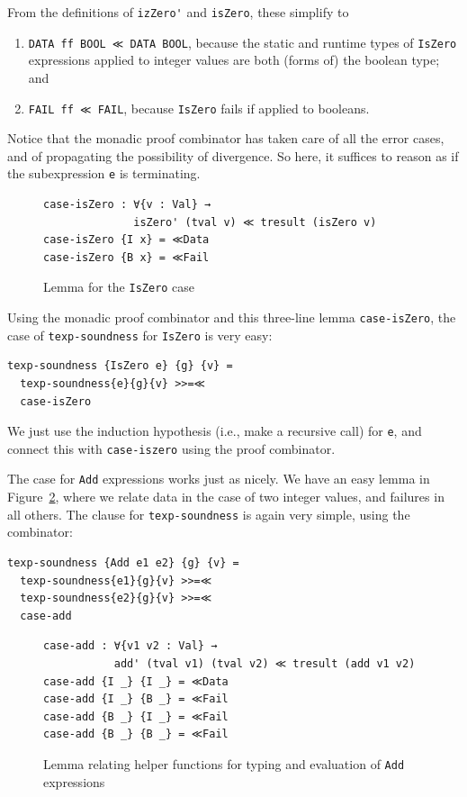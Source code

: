 \documentclass[acmsmall,screen,review]{acmart}
\begin{document}
\noindent From the definitions of \verb|izZero'| and \verb|isZero|,
these simplify to 
\begin{enumerate}
\item \verb|DATA ff BOOL ≪ DATA BOOL|, because the static and runtime types of \verb|IsZero| expressions applied to integer values are both (forms of) the boolean type; and 
\item \verb|FAIL ff ≪ FAIL|, because \verb|IsZero| fails if applied to booleans.
\end{enumerate}
\noindent Notice that the monadic proof combinator has taken care of
all the error cases, and of propagating the possibility of divergence.
So here, it suffices to reason as if the subexpression \verb|e| is
terminating.

\begin{figure}
\begin{verbatim}
case-isZero : ∀{v : Val} →
              isZero' (tval v) ≪ tresult (isZero v)
case-isZero {I x} = ≪Data
case-isZero {B x} = ≪Fail
\end{verbatim}
\caption{Lemma for the \texttt{IsZero} case}
\label{fig:caseiszero}
\end{figure}

Using the monadic proof combinator and this three-line lemma \verb|case-isZero|, the case of \verb|texp-soundness| for \verb|IsZero|
is very easy:
\begin{verbatim}
texp-soundness {IsZero e} {g} {v} = 
  texp-soundness{e}{g}{v} >>=≪
  case-isZero  
\end{verbatim}
\noindent We just use the induction hypothesis (i.e., make a recursive
call) for \verb|e|, and connect this with \verb|case-iszero| using
the proof combinator.


The case for \verb|Add| expressions works just as nicely.  We have an easy lemma in Figure~\ref{fig:addll},
where we relate data in the case of two integer values, and failures in all others.
The clause for \verb|texp-soundness| is again very simple, using the combinator:
\begin{verbatim}
texp-soundness {Add e1 e2} {g} {v} = 
  texp-soundness{e1}{g}{v} >>=≪
  texp-soundness{e2}{g}{v} >>=≪
  case-add
\end{verbatim}

\begin{figure}
\begin{verbatim}
case-add : ∀{v1 v2 : Val} →
           add' (tval v1) (tval v2) ≪ tresult (add v1 v2)
case-add {I _} {I _} = ≪Data
case-add {I _} {B _} = ≪Fail
case-add {B _} {I _} = ≪Fail
case-add {B _} {B _} = ≪Fail
\end{verbatim}
\caption{Lemma relating helper functions for typing and evaluation of \texttt{Add} expressions}
\label{fig:addll}
\end{figure}
\end{document}
